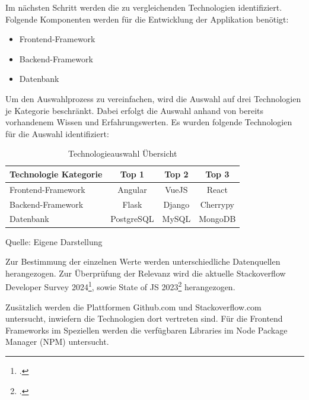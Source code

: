 Im nächsten Schritt werden die zu vergleichenden Technologien identifiziert.
Folgende Komponenten werden für die Entwicklung der Applikation benötigt:

\begin{itemize}
  \item Frontend-Framework
  \item Backend-Framework
  \item Datenbank
\end{itemize}

Um den Auswahlprozess zu vereinfachen, wird die Auswahl auf drei Technologien je Kategorie beschränkt.
Dabei erfolgt die Auswahl anhand von bereits vorhandenem Wissen und Erfahrungswerten.
Es wurden folgende Technologien für die Auswahl identifiziert:

\begin{table}[htbp]
  \centering
  \begin{tabular}{|l|c|c|c|}
      \hline
      \textbf{Technologie Kategorie} & \textbf{Top 1} & \textbf{Top 2} & \textbf{Top 3} \\ \hline
      {Frontend-Framework} & Angular & VueJS & React \\ \hline
      {Backend-Framework} & Flask & Django & Cherrypy \\ \hline
      {Datenbank} & PostgreSQL & MySQL & MongoDB \\ \hline
  \end{tabular}
  \caption{Technologieauswahl Übersicht}\label{tab:Technologieauswahl Übersicht}
  \vspace{0.5cm}
  \raggedright Quelle: Eigene Darstellung
\end{table}

Zur Bestimmung der einzelnen Werte werden unterschiedliche Datenquellen herangezogen.
Zur Überprüfung der Relevanz wird die aktuelle Stackoverflow Developer Survey 2024\footcite{StackOverflow2024}, sowie State of JS 2023\footcite{stateofjsStateJavaScript2023} herangezogen.

Zusätzlich werden die Plattformen Github.com und Stackoverflow.com untersucht, inwiefern die Technologien dort vertreten sind.
Für die Frontend Frameworks im Speziellen werden die verfügbaren Libraries im Node Package Manager (NPM) untersucht.

